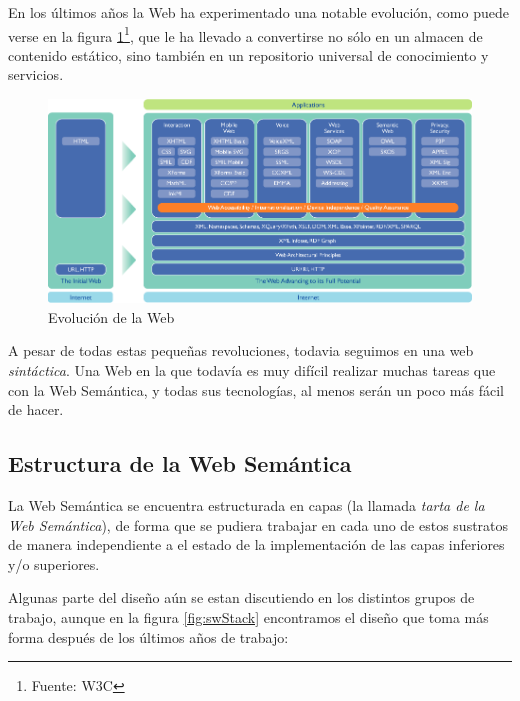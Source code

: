 En los últimos años la Web ha experimentado una notable evolución, como puede 
verse en la figura \ref{fig:evoWeb}\footnote{Fuente: W3C}, que le ha llevado a 
convertirse no sólo en un almacen de contenido estático, sino también en un 
repositorio universal de conocimiento y servicios.

\begin{figure}[H]
	\centering
	\includegraphics[width=12cm]{images/web-evolution.png}
	\caption{Evolución de la Web}
	\label{fig:evoWeb}
\end{figure}

A pesar de todas estas pequeñas revoluciones, todavia seguimos en una web 
\emph{sintáctica}. Una Web en la que todavía es muy difícil realizar
muchas tareas que con la Web Semántica, y todas sus tecnologías, al menos
serán un poco más fácil de hacer.

\subsection{Estructura de la Web Semántica}

La Web Semántica se encuentra estructurada en capas (la llamada \emph{tarta de 
la Web Semántica}), de forma que se pudiera trabajar en cada uno de estos
sustratos de manera independiente a el estado de la implementación de las
capas inferiores y/o superiores.

Algunas parte del diseño aún se estan discutiendo en los distintos grupos de
trabajo, aunque en la figura \ref{fig:swStack} encontramos el diseño que toma
más forma después de los últimos años de trabajo:

